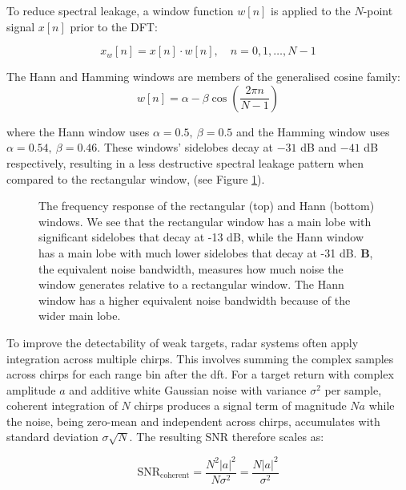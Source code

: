 To reduce spectral leakage, a window function $w[n]$ is applied to the $N$-point signal 
$x[n]$ prior to the DFT:

\begin{equation}
    x_w[n] = x[n] \cdot w[n], \quad n = 0, 1, \ldots, N-1
    \label{eq:windowing}
\end{equation}

The Hann and Hamming windows are members of the generalised cosine family:
\begin{equation}
    w[n] = \alpha - \beta\cos\left(\frac{2\pi n}{N-1}\right)
    \label{eq:cosine_window}
\end{equation}

where the Hann window uses $\alpha = 0.5,\ \beta = 0.5$ and the Hamming window uses 
$\alpha = 0.54,\ \beta = 0.46$. These windows' sidelobes decay at $-31$ dB and $-41$ dB
respectively, resulting in a less destructive spectral leakage pattern when compared to
the rectangular window, (see Figure \ref{fig:hann fourier transform}).

\begin{figure}
    \caption[Rectangular window and Hann window frequency responses]{The frequency response
    of the rectangular (top) and Hann (bottom) windows. We see that the rectangular window
    has a main lobe with significant sidelobes that decay at -13 dB, while the Hann window
    has a main lobe with much lower sidelobes that decay at -31 dB. \(\textbf{B}\), the
    equivalent noise bandwidth, measures how much noise the window generates relative to a
    rectangular window. The Hann window has a higher equivalent noise bandwidth because of
    the wider main lobe.}
    \label{fig:hann fourier transform}
\end{figure}

To improve the detectability of weak targets, radar systems often apply integration 
across multiple chirps. This involves summing the complex samples across chirps for each 
range bin after the \gls{dft}. For a target return with complex amplitude $a$ and additive 
white Gaussian noise with variance $\sigma^2$ per sample, coherent integration of $N$ 
chirps produces a signal term of magnitude $Na$ while the noise, being zero-mean and 
independent across chirps, accumulates with standard deviation $\sigma\sqrt{N}$. The 
resulting SNR therefore scales as:

\begin{equation}
    \text{SNR}_{\text{coherent}} = \frac{N^2 |a|^2}{N\sigma^2} = \frac{N|a|^2}{\sigma^2}
    \label{eq:snr_coherent}
\end{equation}

